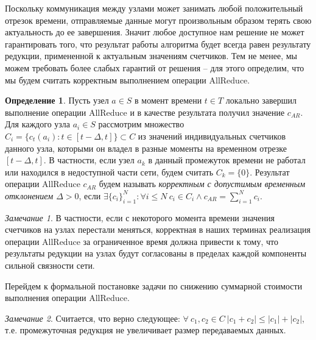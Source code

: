 \documentclass{article}
\theoremstyle{plain}
\theoremstyle{plain}
\theoremstyle{plain}
\theoremstyle{plain}
\theoremstyle{definition}
\newtheorem{definition}{Определение}[section]
\theoremstyle{remark}
\newtheorem{remark}{Замечание}[section]
\theoremstyle{plain}
\begin{document}
Поскольку коммуникация между узлами может занимать любой положительный отрезок времени, отправляемые данные могут произвольным образом терять свою актуальность до ее завершения. Значит любое доступное нам решение не может гарантировать того, что результат работы алгоритма будет всегда равен результату редукции, примененной к актуальным значениям счетчиков. Тем не менее, мы можем требовать более слабых гарантий от решения -- для этого определим, что мы будем считать корректным выполнением операции AllReduce.

\begin{definition}
\label{AllReduceСorrectness}
    Пусть узел $a \in S$ в момент времени $t \in T$ локально завершил выполнение операции AllReduce и в качестве результата получил значение $c_{AR}$. Для каждого узла $a_i \in S$ рассмотрим множество $C_i = \{ c_t(a_i) : t \in [t - \Delta, t] \} \subset C$ из значений индивидуальных счетчиков данного узла, которыми он владел в разные моменты на временном отрезке $[t - \Delta, t]$. В частности, если узел $a_k$ в данный промежуток времени не работал или находился в недоступной части сети, будем считать $C_k = \{ 0 \}$. Результат операции AllReduce $c_{AR}$ будем называть \textit{корректным с допустимым временным отклонением $\Delta > 0$}, если $\exists \{ c_i \}_{i = 1}^N : \forall i \leq N\ c_i \in C_i \wedge c_{AR} = \displaystyle \sum_{i = 1}^N c_i$.
\end{definition}

\begin{remark}
    В частности, если с некоторого момента времени значения счетчиков на узлах перестали меняться, корректная в наших терминах реализация операции AllReduce за ограниченное время должна привести к тому, что результаты редукции на узлах будут согласованы в пределах каждой компоненты сильной связности сети.
\end{remark}

Перейдем к формальной постановке задачи по снижению суммарной стоимости выполнения операции AllReduce.

\begin{remark}
\label{ReductionOptimization}
    Считается, что верно следующее: $\forall\ c_1, c_2 \in C\ |c_1 + c_2| \leq |c_1| + |c_2|$, т.е. промежуточная редукция не увеличивает размер передаваемых данных.
\end{remark}
\end{document}
